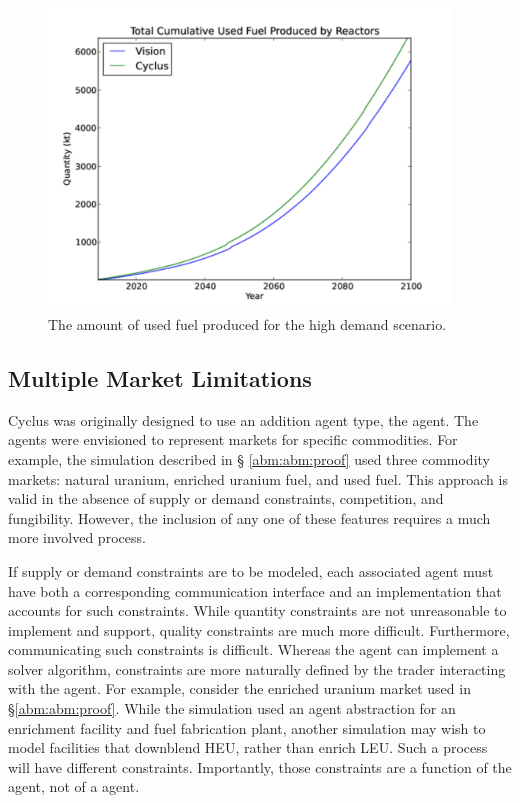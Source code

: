 \begin{figure}
  \begin{center}
    \includegraphics[height=8cm]{./figs/used_fuel_high.pdf}
    \caption{The amount of used fuel produced for the high demand scenario.}
    \label{fig:used_fuel_high}
  \end{center}  
\end{figure}

\subsection{Multiple Market Limitations}\label{abm:abm:limits}

Cyclus was originally designed to use an addition agent type, the 
agent. The  agents were envisioned to represent markets for
specific commodities. For example, the simulation described in \S
\ref{abm:abm:proof} used three commodity markets: natural uranium, enriched
uranium fuel, and used fuel. This approach is valid in the absence of supply or
demand constraints, competition, and fungibility. However, the inclusion of any
one of these features requires a much more involved process.

If supply or demand constraints are to be modeled, each
associated  agent must have both a corresponding communication
interface and an implementation that accounts for such constraints. While
quantity constraints are not unreasonable to implement and support, quality
constraints are much more difficult. Furthermore, communicating such constraints
is difficult. Whereas the  agent can implement a solver algorithm,
constraints are more naturally defined by the trader interacting with the
 agent. For example, consider the enriched uranium market used in
\S \ref{abm:abm:proof}. While the simulation used an agent abstraction for an
enrichment facility and fuel fabrication plant, another simulation may wish to
model facilities that downblend HEU, rather than enrich LEU. Such a process will
have different constraints. Importantly, those constraints are a function of the
 agent, not of a  agent.

